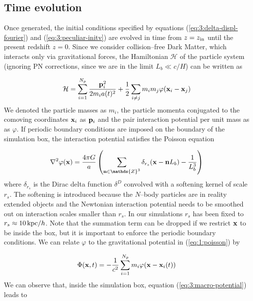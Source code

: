 \subsection{Time evolution}
Once generated, the initial conditions specified by equations (\ref{eq:3:delta-displ-fourier}) and (\ref{eq:3:peculiar-initv}) are evolved in time from $z=z_{\rm in}$ until the present redshift $z=0$. Since we consider collision--free Dark Matter, which interacts only via gravitational forces, the Hamiltonian $\mathcal{H}$ of the particle system (ignoring PN corrections, since we are in the limit $L_b\ll c/H$) can be written as 

\begin{equation}
\label{eq:3:collisionless-ham}
\mathcal{H} = \sum_{i=1}^{N_p} \frac{\mathbf{p}_i^2}{2m_i a(t)^2} + \frac{1}{2}\sum_{i\neq j}m_im_j\varphi(\mathbf{x}_i-\mathbf{x}_j)
\end{equation} 
%
We denoted the particle masses as $m_i$, the particle momenta conjugated to the comoving coordinates $\mathbf{x}_i$ as $\mathbf{p}_i$ and the pair interaction potential per unit mass as as $\varphi$. If periodic boundary conditions are imposed on the boundary of the simulation box, the interaction potential satisfies the Poisson equation

\begin{equation}
\label{eq:3:part-poisson}
\nabla^2\varphi(\bb{x}) = \frac{4\pi G}{a}\left(\sum_{\bb{n}\in\mathds{Z}^3}\delta_{r_s}(\bb{x}-\bb{n}L_b)-\frac{1}{L_b^3}\right) 
\end{equation}
%
where $\delta_{r_s}$ is the Dirac delta function $\delta^D$ convolved with a softening kernel of scale $r_s$. The softening is introduced because the $N$--body particles are in reality extended objects and the Newtonian interaction potential needs to be smoothed out on interaction scales smaller than $r_s$. In our simulations $r_s$ has been fixed to $r_s\approx 10\,{\rm kpc}/h$. Note that the summation term can be dropped if we restrict $\mathbf{x}$ to be inside the box, but it is important to enforce the periodic boundary conditions. We can relate $\varphi$ to the gravitational potential in (\ref{eq:1:poisson}) by    

\begin{equation}
\label{eq:3:macro-potential}
\Phi(\mathbf{x},t) = -\frac{1}{c^2}\sum_{i=1}^{N_p} m_i\varphi(\mathbf{x}-\mathbf{x}_i(t))
\end{equation} 
%
We can observe that, inside the simulation box, equation (\ref{eq:3:macro-potential}) leads to 

